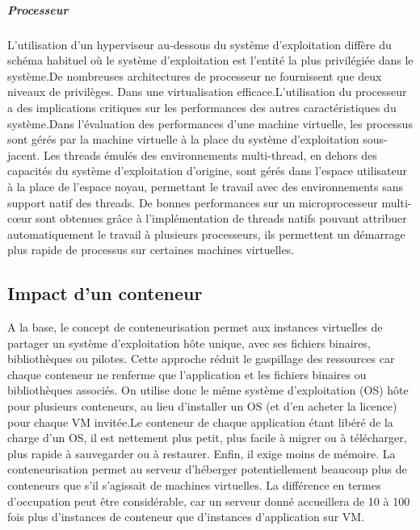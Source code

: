 \subparagraph{Processeur}
L'utilisation d'un hyperviseur au-dessous du système d'exploitation diffère du schéma habituel où le système d'exploitation est l'entité la plus privilégiée dans le système.De nombreuses architectures de processeur ne fournissent que deux niveaux de privilèges. Dans une virtualisation efficace.L'utilisation du processeur a des implications critiques sur les performances des autres caractéristiques du système.Dans l'évaluation des performances d'une machine virtuelle, les processus sont gérés par la machine virtuelle à la place du système d'exploitation sous-jacent. Les threads émulés des environnements multi-thread, en dehors des capacités du système d'exploitation d'origine, sont gérés dans l'espace utilisateur à la place de l'espace noyau, permettant le travail avec des environnements sans support natif des threads. De bonnes performances sur un microprocesseur multi-cœur sont obtenues grâce à l'implémentation de threads natifs pouvant attribuer automatiquement le travail à plusieurs processeurs, ils permettent un démarrage plus rapide de processus sur certaines machines virtuelles.

\subsection{Impact d'un conteneur}
A la base, le concept de conteneurisation permet aux instances virtuelles de partager un système d'exploitation hôte unique, avec ses fichiers binaires, bibliothèques ou pilotes. 
Cette approche réduit le gaspillage des ressources car chaque conteneur ne renferme que l'application et les fichiers binaires ou bibliothèques associés. On utilise donc le même système d'exploitation (OS) hôte pour plusieurs conteneurs, au lieu d'installer un OS (et d'en acheter la licence) pour chaque VM invitée.Le conteneur de chaque application étant libéré de la charge d'un OS, il est nettement plus petit, plus facile à migrer ou à télécharger, plus rapide à sauvegarder ou à restaurer. Enfin, il exige moins de mémoire. La conteneurisation permet au serveur d'héberger potentiellement beaucoup plus de conteneurs que s'il s'agissait de machines virtuelles. La différence en termes d'occupation peut être considérable, car un serveur donné accueillera de 10 à 100 fois plus d'instances de conteneur que d'instances d'application sur VM.
